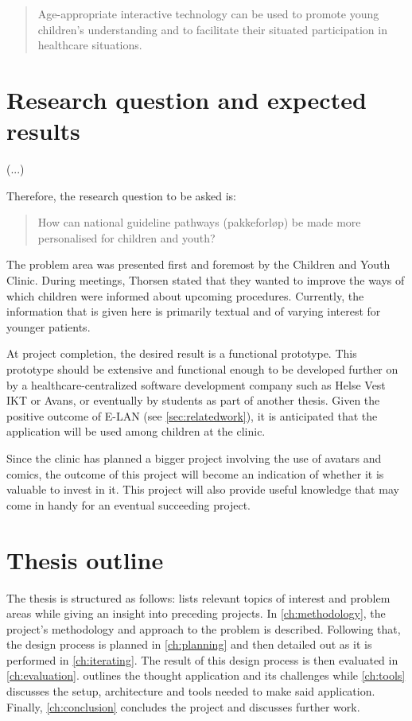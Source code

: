 \begin{quote}
    Age-appropriate interactive technology can be used to promote young children’s understanding and to facilitate their situated participation in healthcare situations.

    \raggedright\textcite{stalberg2018}
\end{quote}

\section{Research question and expected results}

(...)

Therefore, the research question to be asked is:

\begin{quote}
    How can national guideline pathways (pakkeforløp) be made more personalised for children and youth?
\end{quote}

The problem area was presented first and foremost by the Children and Youth Clinic. During meetings, Thorsen stated that they wanted to improve the ways of which children were informed about upcoming procedures. Currently, the information that is given here is primarily textual and of varying interest for younger patients.

At project completion, the desired result is a functional prototype. This prototype should be extensive and functional enough to be developed further on by a healthcare-centralized software development company such as Helse Vest IKT or Avans, or eventually by students as part of another thesis. Given the positive outcome of E-LAN (see \autoref{sec:relatedwork}), it is anticipated that the application will be used among children at the clinic.


Since the clinic has planned a bigger project involving the use of avatars and comics, the outcome of this project will become an indication of whether it is valuable to invest in it. This project will also provide useful knowledge that may come in handy for an eventual succeeding project.

\section{Thesis outline}

The thesis is structured as follows:  lists relevant topics of interest and problem areas while giving an insight into preceding projects. In \autoref{ch:methodology}, the project's methodology and approach to the problem is described. Following that, the design process is planned in \autoref{ch:planning} and then detailed out as it is performed in \autoref{ch:iterating}. The result of this design process is then evaluated in \autoref{ch:evaluation}.  outlines the thought application and its challenges while \autoref{ch:tools} discusses the setup, architecture and tools needed to make said application. Finally, \autoref{ch:conclusion} concludes the project and discusses further work.
